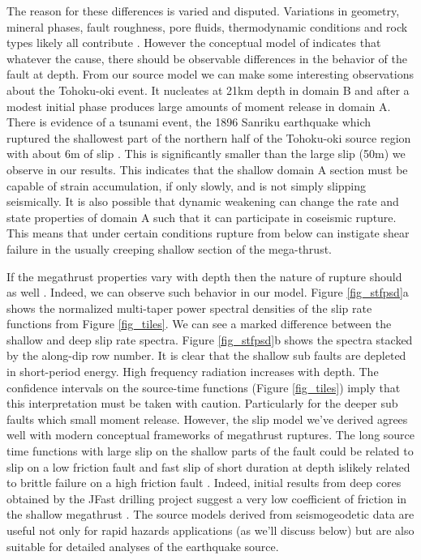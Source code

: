 The reason for these differences is varied and disputed. Variations in geometry, mineral phases, fault roughness, pore fluids, thermodynamic conditions and rock types likely all contribute \citep{heuret2011}. However the conceptual model of \citep{lay2012} indicates that whatever the cause, there should be observable differences in the behavior of the fault at depth. From our source model we can make some interesting observations about the Tohoku-oki event. It nucleates at 21km depth in domain B and after a modest initial phase produces large amounts of moment release in domain A. There is evidence of a tsunami event, the 1896 Sanriku earthquake which ruptured the shallowest part of the northern half of the Tohoku-oki source region with about 6m of slip \citep{tanioka1996}. This is significantly smaller than the large slip (50m) we observe in our results. This indicates that the shallow domain A section must be capable of strain accumulation, if only slowly, and is not simply slipping seismically. It is also possible that dynamic weakening can change the rate and state properties of domain A \citep{noda2013} such that it can participate in coseismic rupture. This means that under certain conditions rupture from below can instigate shear failure in the usually creeping shallow section of the mega-thrust.

If the megathrust properties vary with depth then the nature of rupture should as well \citep{lay2012}. Indeed, we can observe such behavior in our model. Figure \ref{fig_stfpsd}a shows the normalized multi-taper power spectral densities of the slip rate functions from Figure \ref{fig_tiles}. We can see a marked difference between the shallow and deep slip rate spectra. Figure \ref{fig_stfpsd}b shows the spectra stacked by the along-dip row number. It is clear that the shallow sub faults are depleted in short-period energy. High frequency radiation increases with depth. The confidence intervals on the source-time functions (Figure \ref{fig_tiles}) imply that this interpretation must be taken with caution. Particularly for the deeper sub faults which small moment release. However, the slip model we've derived agrees well with modern conceptual frameworks of megathrust ruptures. The long source time functions with large slip on the shallow parts of the fault could be related to slip on a low friction fault and fast slip of short duration at depth islikely related to brittle failure on a high friction fault \citep{kanamori2004}. Indeed, initial results from deep cores obtained by the JFast drilling project suggest a very low coefficient of friction in the shallow megathrust \citep{fulton2013}. The source models derived from seismogeodetic data are useful not only for rapid hazards applications (as we'll discuss below) but are also suitable for detailed analyses of the earthquake source.

